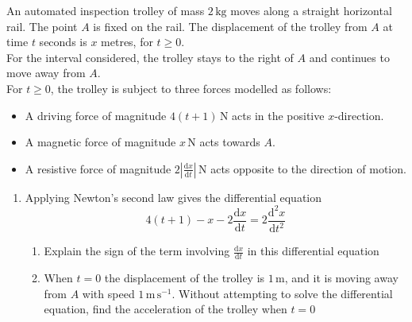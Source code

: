 \documentclass[leqno]{article}
\begin{document}
\begin{enumerate}[
  label=\textbf{\arabic*.},
  leftmargin=*,
  topsep=0pt,
  partopsep=0pt,
  parsep=0pt
]
An automated inspection trolley of mass $2\,\mathrm{kg}$ moves along a straight horizontal rail. The point $A$ is fixed on the rail. The displacement of the trolley from $A$ at time $t$ seconds is $x$ metres, for $t\ge 0$. \\

For the interval considered, the trolley stays to the right of $A$ and continues to move away from $A$. \\

For $t\ge 0$, the trolley is subject to three forces modelled as follows:
\begin{itemize}
  \item A driving force of magnitude $4(t+1)\,\mathrm{N}$ acts in the positive $x$-direction.
  \item A magnetic force of magnitude $x\,\mathrm{N}$ acts towards $A$.
  \item A resistive force of magnitude $2\left|\tfrac{\mathrm{d}x}{\mathrm{d}t}\right|\,\mathrm{N}$ acts opposite to the direction of motion.
\end{itemize}
\vspace{\baselineskip}

\begin{enumerate}[label=\textbf{(\alph*)}]
  \item Applying Newton's second law gives the differential equation
  \[
  4(t+1)-x-2\frac{\mathrm{d}x}{\mathrm{d}t}=2\frac{\mathrm{d}^2 x}{\mathrm{d} t^2}
  \]
  \begin{enumerate}[label=(\roman*)]
    \item Explain the sign of the term involving $\frac{\mathrm{d}x}{\mathrm{d}t}$ in this differential equation 
    \item When $t=0$ the displacement of the trolley is $1\,\mathrm{m}$, and it is moving away from $A$ with speed $1\,\mathrm{m\,s^{-1}}$. Without attempting to solve the differential equation, find the acceleration of the trolley when $t=0$  \\
  

\end{enumerate}
\end{enumerate}
\end{enumerate}
\end{document}
